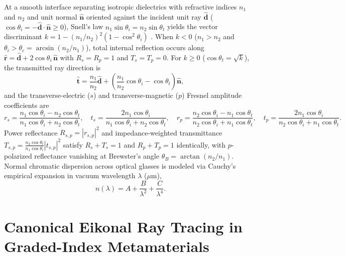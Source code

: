 \documentclass[12pt]{article}
\begin{document}
At a smooth interface separating isotropic dielectrics with refractive indices $n_1$ and $n_2$ and unit normal $\hat{\mathbf{n}}$ oriented against the incident unit ray $\hat{\mathbf{d}}$ ($\cos\theta_i = -\hat{\mathbf{d}}\cdot\hat{\mathbf{n}} \ge 0$), Snell's law $n_1\sin\theta_i = n_2\sin\theta_t$ yields the vector discriminant $k = 1 - (n_1/n_2)^2(1 - \cos^2\theta_i)$ \cite{born1999principles}. When $k < 0$ ($n_1 > n_2$ and $\theta_i > \theta_c = \arcsin(n_2/n_1)$), total internal reflection occurs along $\hat{\mathbf{r}} = \hat{\mathbf{d}} + 2\cos\theta_i\,\hat{\mathbf{n}}$ with $R_s = R_p = 1$ and $T_s = T_p = 0$. For $k \ge 0$ ($\cos\theta_t = \sqrt{k}$), the transmitted ray direction is
\begin{equation}
\hat{\mathbf{t}} = \frac{n_1}{n_2}\hat{\mathbf{d}} + \left(\frac{n_1}{n_2}\cos\theta_i - \cos\theta_t\right)\hat{\mathbf{n}},
\end{equation}
and the transverse-electric ($s$) and transverse-magnetic ($p$) Fresnel amplitude coefficients are
\begin{equation}
r_s = \frac{n_1\cos\theta_i - n_2\cos\theta_t}{n_1\cos\theta_i + n_2\cos\theta_t}, \quad
t_s = \frac{2 n_1\cos\theta_i}{n_1\cos\theta_i + n_2\cos\theta_t}, \quad
r_p = \frac{n_2\cos\theta_i - n_1\cos\theta_t}{n_2\cos\theta_i + n_1\cos\theta_t}, \quad
t_p = \frac{2 n_1\cos\theta_i}{n_2\cos\theta_i + n_1\cos\theta_t}.
\end{equation}
Power reflectance $R_{s,p} = |r_{s,p}|^2$ and impedance-weighted transmittance $T_{s,p} = \frac{n_2\cos\theta_t}{n_1\cos\theta_i}|t_{s,p}|^2$ satisfy $R_s + T_s = 1$ and $R_p + T_p = 1$ identically, with $p$-polarized reflectance vanishing at Brewster's angle $\theta_B = \arctan(n_2 / n_1)$. Normal chromatic dispersion across optical glasses is modeled via Cauchy's empirical expansion in vacuum wavelength $\lambda$ ($\mu\text{m}$),
\begin{equation}
n(\lambda) = A + \frac{B}{\lambda^2} + \frac{C}{\lambda^4}.
\end{equation}

\section{Canonical Eikonal Ray Tracing in Graded-Index Metamaterials}
\end{document}

